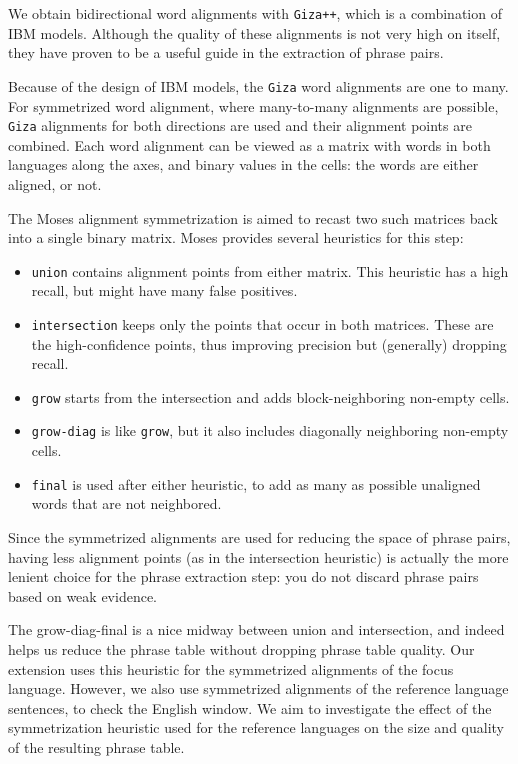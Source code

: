\documentclass[11pt]{article}
\begin{document}
We obtain  bidirectional word alignments with {\tt Giza++}, which is a combination of IBM models. Although the quality of these alignments is not very high on itself, they have proven to be a useful guide in the extraction of phrase pairs. 


Because of the design of IBM models, the {\tt Giza} word alignments are one to many. For symmetrized word alignment, where many-to-many alignments are possible, {\tt Giza} alignments for both directions are used and their alignment points are combined. Each word alignment can be viewed as a matrix with words in both languages along the axes, and binary values in the cells: the words are either aligned, or not. 

The Moses alignment symmetrization is aimed to recast two such matrices back into a single binary matrix. 
Moses provides several heuristics for this step:\begin{itemize}
\item {\tt union} contains alignment points from either matrix. This heuristic has a high recall, but might have many false positives.
\item  {\tt intersection} keeps only the points that occur in both matrices. These are the high-confidence points, thus improving precision but (generally) dropping recall.
\item {\tt grow} starts from the intersection and adds block-neighboring non-empty cells.
\item {\tt grow-diag} is like {\tt grow}, but it also includes diagonally neighboring non-empty cells.
\item {\tt final} is used after either heuristic, to add as many as possible unaligned words that are not neighbored.  %
\end{itemize}

Since the symmetrized alignments are used for reducing the space of phrase pairs, having less alignment points (as in the intersection heuristic) is actually the more lenient choice for the phrase extraction step: you do not discard phrase pairs based on weak evidence. 

The grow-diag-final is a nice midway between union and intersection, and indeed helps us reduce the phrase table without dropping phrase table quality. Our extension uses this heuristic for the symmetrized alignments of the focus language. However, we also use symmetrized alignments of the reference language sentences, to check the English window. We aim to investigate the effect of the symmetrization heuristic used for the reference languages on the size and quality of the resulting phrase table.
\end{document}
